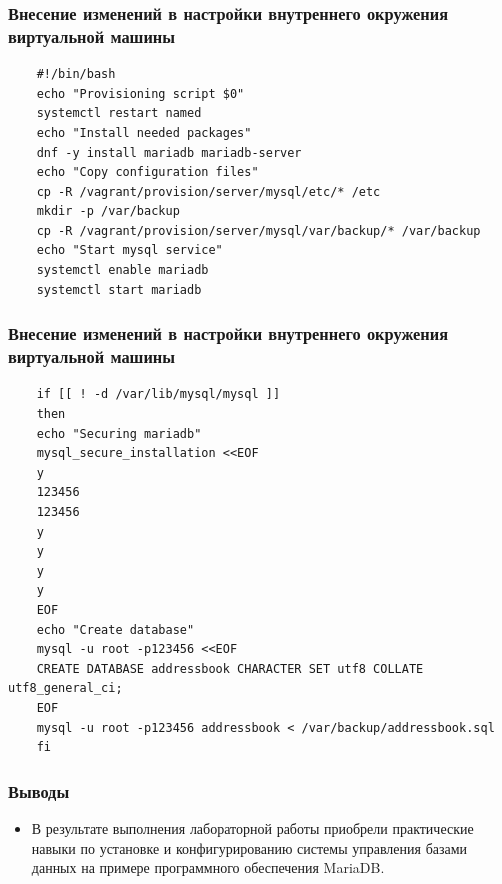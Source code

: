 \begin{frame}[containsverbatim]
\frametitle{Внесение изменений в настройки внутреннего окружения виртуальной машины}
  \begin{verbatim}
    #!/bin/bash
    echo "Provisioning script $0"
    systemctl restart named
    echo "Install needed packages"
    dnf -y install mariadb mariadb-server
    echo "Copy configuration files"
    cp -R /vagrant/provision/server/mysql/etc/* /etc
    mkdir -p /var/backup
    cp -R /vagrant/provision/server/mysql/var/backup/* /var/backup
    echo "Start mysql service"
    systemctl enable mariadb
    systemctl start mariadb
  \end{verbatim}
\end{frame}

\begin{frame}[containsverbatim]
\frametitle{Внесение изменений в настройки внутреннего окружения виртуальной машины}
\begin{verbatim}
    if [[ ! -d /var/lib/mysql/mysql ]]
    then
    echo "Securing mariadb"
    mysql_secure_installation <<EOF
    y
    123456
    123456
    y
    y
    y
    y
    EOF
    echo "Create database"
    mysql -u root -p123456 <<EOF
    CREATE DATABASE addressbook CHARACTER SET utf8 COLLATE utf8_general_ci;
    EOF
    mysql -u root -p123456 addressbook < /var/backup/addressbook.sql
    fi
\end{verbatim}
\end{frame}

\begin{frame}
\frametitle{Выводы}
\begin{itemize}
    \item В результате выполнения лабораторной работы приобрели практические навыки по установке и конфигурированию системы управления базами данных на примере программного обеспечения MariaDB.
\end{itemize}
\end{frame}

